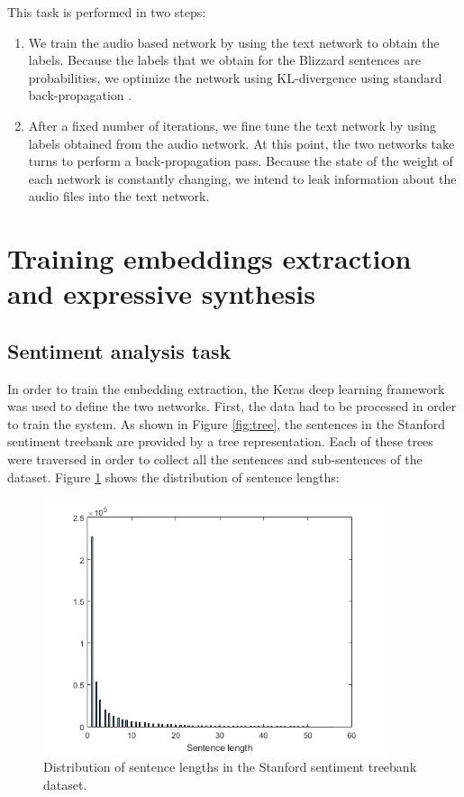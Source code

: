 This task is performed in two steps:

\begin{enumerate}
    \item We train the audio based network by using the text network to obtain the labels. Because the labels that we obtain for the Blizzard sentences are probabilities, we optimize the network using KL-divergence using standard back-propagation \cite{aytar2016soundnet}.
    \item After a fixed number of iterations, we fine tune \cite{yosinski2014transferable} the text network by using labels obtained from the audio network. At this point, the two networks take turns to perform a back-propagation pass. Because the state of the weight of each network is constantly changing, we intend to leak information about the audio files into the text network.
\end{enumerate}

\section{Training embeddings extraction and expressive synthesis}

\subsection*{Sentiment analysis task}

In order to train the embedding extraction, the Keras deep learning framework was used to define the two networks. First, the data had to be processed in order to train the system. As shown in Figure \ref{fig:tree}, the sentences in the Stanford sentiment treebank are provided by a tree representation. Each of these trees were traversed in order to collect all the sentences and sub-sentences of the dataset. Figure \ref{fig:sent-histo} shows the distribution of sentence lengths:

\begin{figure}[h]
    \centering
    \includegraphics[width=10cm]{figures/sa-histo}
    \caption{Distribution of sentence lengths in the Stanford sentiment treebank dataset.}
    \label{fig:sent-histo}
\end{figure}

